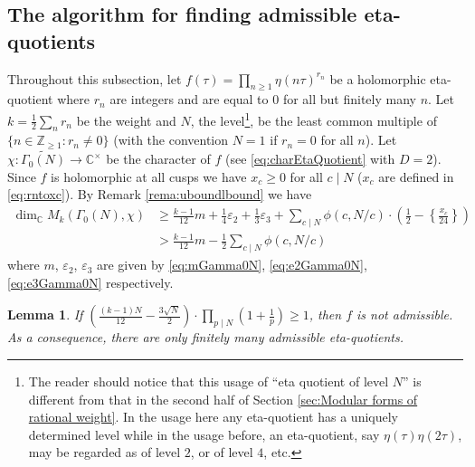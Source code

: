 \documentclass[12pt]{amsart}
\numberwithin{equation}{section}
\theoremstyle{plain}
\newtheorem{lemm}[thm]{Lemma}
\theoremstyle{definition}
\theoremstyle{remark}
\newcommand\numC{\mathbb{C}}
\newcommand\numgeq[2]{\mathbb{#1}_{\geq #2}}
\begin{document}
\subsection{The algorithm for finding admissible eta-quotients}
\label{subsec:The algorithm for finding admissible eta-quotients}
Throughout this subsection, let $f(\tau)=\prod_{n\geq1}\eta(n\tau)^{r_n}$ be a holomorphic eta-quotient where $r_n$ are integers and are equal to $0$ for all but finitely many $n$. Let $k=\frac{1}{2}\sum_nr_n$ be the weight and $N$, the level\footnote{The reader should notice that this usage of ``eta quotient of level $N$'' is different from that in the second half of Section \ref{sec:Modular forms of rational weight}. In the usage here any eta-quotient has a uniquely determined level while in the usage before, an eta-quotient, say $\eta(\tau)\eta(2\tau)$, may be regarded as of level $2$, or of level $4$, etc.}, be the least common multiple of $\{n\in\numgeq{Z}{1}\colon r_n\neq0\}$ (with the convention $N=1$ if $r_n=0$ for all $n$). Let $\chi\colon\widetilde{\Gamma_0(N)}\rightarrow\numC^\times$ be the character of $f$ (see \eqref{eq:charEtaQuotient} with $D=2$). Since $f$ is holomorphic at all cusps we have $x_c\geq0$ for all $c\mid N$ ($x_c$ are defined in \eqref{eq:rntoxc}).  By Remark \ref{rema:uboundlbound} we have
\begin{align*}
\dim_\numC M_k(\Gamma_0(N), \chi)&\geq\frac{k-1}{12}m+\frac{1}{4}\varepsilon_2+\frac{1}{3}\varepsilon_3+\sum_{c\mid N}\phi(c,N/c)\cdot\left(\frac{1}{2}-\left\{\frac{x_c}{24}\right\}\right)\\
&>\frac{k-1}{12}m-\frac{1}{2}\sum_{c\mid N}\phi(c,N/c)
\end{align*}
where $m$, $\varepsilon_2$, $\varepsilon_3$ are given by \eqref{eq:mGamma0N}, \eqref{eq:e2Gamma0N}, \eqref{eq:e3Gamma0N} respectively. %
\begin{lemm}
\label{lemm:admissible}
If $\left(\frac{(k-1)N}{12}-\frac{3\sqrt{N}}{2}\right)\cdot\prod_{p\mid N}\left(1+\frac{1}{p}\right)\geq1$, then $f$ is not admissible. As a consequence, there are only finitely many admissible eta-quotients.
\end{lemm}
\end{document}
